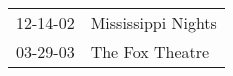 \begin{supertabular}{p{0.25\columnwidth}p{0.75\columnwidth}}
 12-14-02 &  Mississippi Nights \\
 03-29-03 &     The Fox Theatre \\
\end{supertabular}
